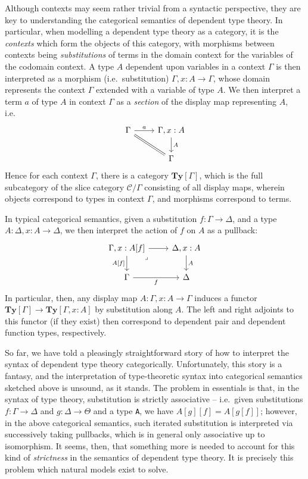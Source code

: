 \documentclass[
  11pt,
  oneside,
  article]{memoir}
\theoremstyle{definition}
\theoremstyle{plain}
\newcommand{\0}{\textsf{0}}
\newcommand{\1}{\tn{\textsf{1}}}
\begin{document}
Although contexts may seem rather trivial from a syntactic perspective,
they are key to understanding the categorical semantics of dependent
type theory. In particular, when modelling a dependent type theory as a
category, it is the \emph{contexts} which form the objects of this
category, with morphisms between contexts being \emph{substitutions} of
terms in the domain context for the variables of the codomain context. A
type \(A\) dependent upon variables in a context \(\Gamma\) is then
interpreted as a morphism (i.e.~substitution)
\(\Gamma, x : A \to \Gamma\), whose domain represents the context
\(\Gamma\) extended with a variable of type \(A\). We then interpret a
term \(a\) of type \(A\) in context \(\Gamma\) as a \emph{section} of
the display map representing \(A\), i.e.~\[
\begin{tikzcd}
    \Gamma & {\Gamma, x : A} \\
    & \Gamma
    \arrow["a", from=1-1, to=1-2]
    \arrow[Rightarrow, no head, from=1-1, to=2-2]
    \arrow["A", from=1-2, to=2-2]
\end{tikzcd}
\] Hence for each context \(\Gamma\), there is a category
\(\mathbf{Ty}[\Gamma]\), which is the full subcategory of the slice
category \(\mathcal{C}/\Gamma\) consisting of all display maps, wherein
objects correspond to types in context \(\Gamma\), and morphisms
correspond to terms.

In typical categorical semantics, given a substitution
\(f : \Gamma \to \Delta\), and a type \(A : \Delta, x : A \to \Delta\),
we then interpret the action of \(f\) on \(A\) as a pullback: \[
\begin{tikzcd}
    {\Gamma, x : A[f]} & {\Delta, x : A} \\
    \Gamma & \Delta
    \arrow[from=1-1, to=1-2]
    \arrow["{A[f]}"', from=1-1, to=2-1]
    \arrow["\lrcorner"{anchor=center, pos=0.125}, draw=none, from=1-1, to=2-2]
    \arrow["A", from=1-2, to=2-2]
    \arrow["f"', from=2-1, to=2-2]
\end{tikzcd}
\] In particular, then, any display map \(A : \Gamma, x : A \to \Gamma\)
induces a functor \(\mathbf{Ty}[\Gamma] \to \mathbf{Ty}[\Gamma, x : A]\)
by substitution along \(A\). The left and right adjoints to this functor
(if they exist) then correspond to dependent pair and dependent function
types, respectively.

So far, we have told a pleasingly straightforward story of how to
interpret the syntax of dependent type theory categorically.
Unfortunately, this story is a fantasy, and the interpretation of
type-theoretic syntax into categorical semantics sketched above is
unsound, as it stands. The problem in essentials is that, in the syntax
of type theory, substitution is strictly associative -- i.e.~given
substitutions \(f : \Gamma \to \Delta\) and \(g : \Delta \to \Theta\)
and a type \texttt{A}, we have \(A[g][f] = A[g[f]]\); however, in the
above categorical semantics, such iterated substitution is interpreted
via successively taking pullbacks, which is in general only associative
up to isomorphism. It seems, then, that something more is needed to
account for this kind of \emph{strictness} in the semantics of dependent
type theory. It is precisely this problem which natural models exist to
solve.
\end{document}
